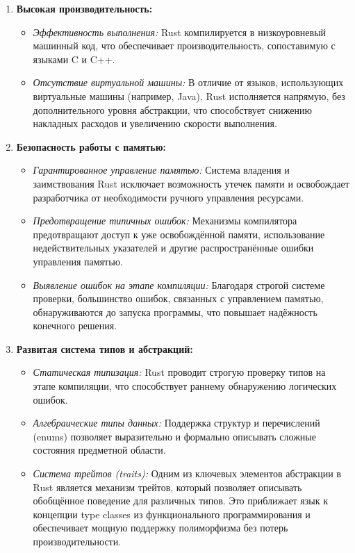 \documentclass{article}
\begin{document}
\begin{enumerate}
  \item \textbf{Высокая производительность:}
    \begin{itemize}
      \item \textit{Эффективность выполнения:} Rust компилируется в низкоуровневый машинный код, что обеспечивает производительность, сопоставимую с языками C и C++.
      \item \textit{Отсутствие виртуальной машины:} В отличие от языков, использующих виртуальные машины (например, Java), Rust исполняется напрямую, без дополнительного уровня абстракции, что способствует снижению накладных расходов и увеличению скорости выполнения.
    \end{itemize}

  \item \textbf{Безопасность работы с памятью:}
    \begin{itemize}
      \item \textit{Гарантированное управление памятью:} Система владения и заимствования Rust исключает возможность утечек памяти и освобождает разработчика от необходимости ручного управления ресурсами.
      \item \textit{Предотвращение типичных ошибок:} Механизмы компилятора предотвращают доступ к уже освобождённой памяти, использование недействительных указателей и другие распространённые ошибки управления памятью.
      \item \textit{Выявление ошибок на этапе компиляции:} Благодаря строгой системе проверки, большинство ошибок, связанных с управлением памятью, обнаруживаются до запуска программы, что повышает надёжность конечного решения.
    \end{itemize}

  \item \textbf{Развитая система типов и абстракций:}
    \begin{itemize}
      \item \textit{Статическая типизация:} Rust проводит строгую проверку типов на этапе компиляции, что способствует раннему обнаружению логических ошибок.
    \item \textit{Алгебраические типы данных:} Поддержка структур и перечислений (enums) позволяет выразительно и формально описывать сложные состояния предметной области.
    \item \textit{Система трейтов (traits):} Одним из ключевых элементов абстракции в Rust является механизм трейтов, который позволяет описывать обобщённое поведение для различных типов. Это приближает язык к концепции type classes из функционального программирования и обеспечивает мощную поддержку полиморфизма без потерь производительности.
    \end{itemize}
\end{enumerate}
\end{document}
